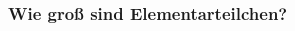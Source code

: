 \documentclass{beamer}
\begin{document}
\begin{frame}
  \frametitle{Wie gro\ss{} sind Elementarteilchen?}
  \vskip-0.2cm
  \begin{columns}[T]
    \begin{column}{0.25\textwidth}
      \centering
\end{column}
\end{columns}
\end{frame}
\end{document}
